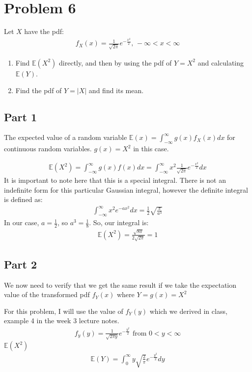 \documentclass{article}
\begin{document}
\clearpage

\section*{Problem 6}
Let $X$ have the pdf:
\begin{align*}
f_X(x) = \frac{1}{\sqrt{2\pi}}e^{-\tfrac{x^2}{2}}\text{, } -\infty < x < \infty
\end{align*}

\begin{enumerate}
\item
Find $\mathbb{E}(X^2)$ directly, and then by using the pdf of $Y=X^2$ and calculating $\mathbb{E}(Y)$.
\item
Find the pdf of $Y=|X|$ and find its mean.

\end{enumerate}

\subsection*{Part 1}
The expected value of a random variable $\mathbb{E}(x)=\int_{-\infty}^{\infty} g(x)f_X(x) dx$ for continuous random variables. $g(x)=X^2$ in this case.

\begin{align*}
\mathbb{E}(X^2) = \int_{-\infty}^{\infty} g(x) f(x) dx = \int_{-\infty}^{\infty} x^2 \frac{1}{\sqrt{2\pi}}e^{-\tfrac{x^2}{2}} dx
\end{align*}
It is important to note here that this is a special integral. There is not an indefinite form for this particular Gaussian integral, however the definite integral is defined as:
\begin{align*}
\int_{-\infty}^{\infty} x^2 e^{-a x^2} dx = \frac{1}{2} \sqrt{\frac{\pi}{a^3}}
\end{align*}
In our case, $a=\frac{1}{2}$, so $a^3=\frac{1}{8}$. So, our integral is:
\begin{align*}
\boxed{\mathbb{E}(X^2) = \frac{\sqrt{{8 \pi}}}{2\sqrt{2\pi}} = 1}
\end{align*}
\subsection*{Part 2}
We now need to verify that we get the same result if we take the expectation value of the transformed pdf $f_Y(x)$ where $Y=g(x)=X^2$

For this problem, I will use the value of $f_Y(y)$ which we derived in class, example 4 in the week 3 lecture notes.
\begin{align*}
f_y(y) = \frac{1}{\sqrt{2\pi y}} e^{-\frac{y^2}{2}} \text{ from } 0<y<\infty
\end{align*}
$\mathbb{E}(X^2)$
\begin{align*}
\mathbb{E}(Y) = \int_{0}^{\infty} y \sqrt{\frac{2}{\pi}} e^{-\frac{y^2}{2}} dy
\end{align*}
\end{document}
